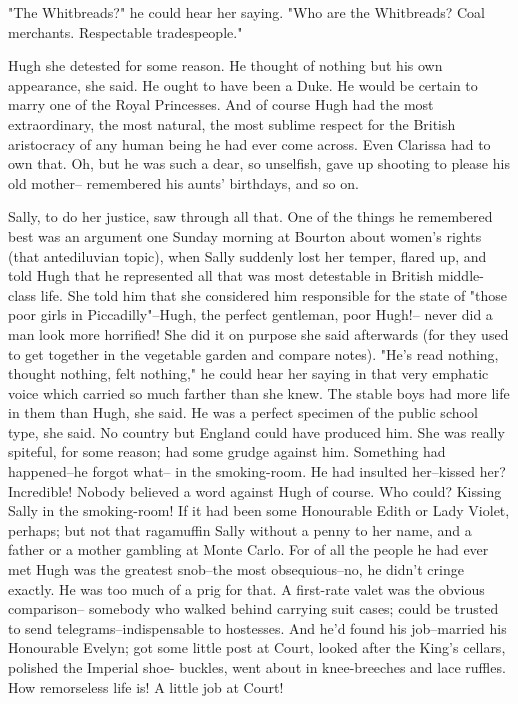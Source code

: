 \documentclass[lang=cn,10pt]{elegantbook}
\begin{document}
"The Whitbreads?" he could hear her saying.  "Who are the
Whitbreads?  Coal merchants.  Respectable tradespeople."

Hugh she detested for some reason.  He thought of nothing but his
own appearance, she said.  He ought to have been a Duke.  He would
be certain to marry one of the Royal Princesses.  And of course
Hugh had the most extraordinary, the most natural, the most sublime
respect for the British aristocracy of any human being he had ever
come across.  Even Clarissa had to own that.  Oh, but he was such a
dear, so unselfish, gave up shooting to please his old mother--
remembered his aunts' birthdays, and so on.

Sally, to do her justice, saw through all that.  One of the things
he remembered best was an argument one Sunday morning at Bourton
about women's rights (that antediluvian topic), when Sally suddenly
lost her temper, flared up, and told Hugh that he represented all
that was most detestable in British middle-class life.  She told
him that she considered him responsible for the state of "those
poor girls in Piccadilly"--Hugh, the perfect gentleman, poor Hugh!--
never did a man look more horrified!  She did it on purpose she
said afterwards (for they used to get together in the vegetable
garden and compare notes).  "He's read nothing, thought nothing,
felt nothing," he could hear her saying in that very emphatic voice
which carried so much farther than she knew.  The stable boys had
more life in them than Hugh, she said.  He was a perfect specimen
of the public school type, she said.  No country but England could
have produced him.  She was really spiteful, for some reason; had
some grudge against him.  Something had happened--he forgot what--
in the smoking-room.  He had insulted her--kissed her?  Incredible!
Nobody believed a word against Hugh of course.  Who could?  Kissing
Sally in the smoking-room!  If it had been some Honourable Edith or
Lady Violet, perhaps; but not that ragamuffin Sally without a penny
to her name, and a father or a mother gambling at Monte Carlo.  For
of all the people he had ever met Hugh was the greatest snob--the
most obsequious--no, he didn't cringe exactly.  He was too much of
a prig for that.  A first-rate valet was the obvious comparison--
somebody who walked behind carrying suit cases; could be trusted to
send telegrams--indispensable to hostesses.  And he'd found his
job--married his Honourable Evelyn; got some little post at Court,
looked after the King's cellars, polished the Imperial shoe-
buckles, went about in knee-breeches and lace ruffles.  How
remorseless life is!  A little job at Court!
\end{document}
